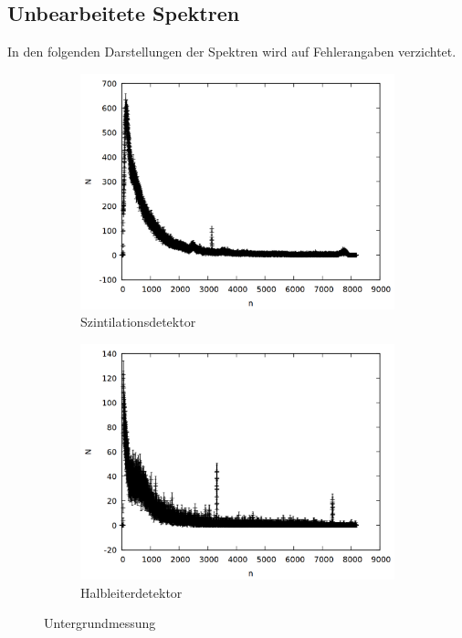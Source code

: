 \subsection{Unbearbeitete Spektren}
In den folgenden Darstellungen der Spektren wird auf Fehlerangaben verzichtet.
\begin{figure}[h]
  \centering
  \begin{subfigure}[h]{0.5\textwidth}
    \centering
    \includegraphics[width=\textwidth]{data/si_unter.png}
    \caption{Szintilationsdetektor}
  \end{subfigure}%
  \begin{subfigure}[h]{0.5\textwidth}
    \centering
    \includegraphics[width=\textwidth]{data/ge_unter.png}
    \caption{Halbleiterdetektor}
  \end{subfigure}
  \caption{Untergrundmessung}
\end{figure}

